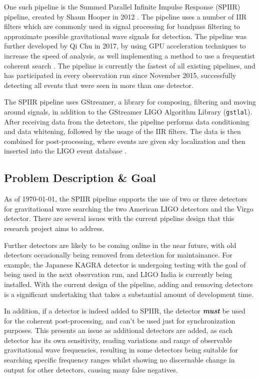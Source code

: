 \documentclass{article}
\begin{document}
One such pipeline is the Summed Parallel Infinite Impulse Response (SPIIR) pipeline, created by
Shaun Hooper in 2012 \cite{SPIIRCreate}. The pipeline uses a number of IIR filters \textendash{}
which are commonly used in signal processing for bandpass filtering \textendash{} to approximate
possible gravitational wave signals for detection. The pipeline was further developed by Qi Chu in
2017, by using GPU acceleration techniques to increase the speed of analysis, as well implementing
a method to use a frequentist coherent search \cite{ChuThesis}. The pipeline is currently the
fastest of all existing pipelines, and has participated in every observation run since November
2015, successfully detecting all events that were seen in more than one detector.

The SPIIR pipeline uses GStreamer, a library for composing, filtering and moving around signals, in
addition to the GStreamer LIGO Algorithm Library (\texttt{gstlal}). After receiving data from the
detectors, the pipeline performs data conditioning and data whitening, followed by the usage of the
IIR filters. The data is then combined for post-processing, where events are given sky localization
and then inserted into the LIGO event database \cite{SPIIRGPU2018}.

\subsection{Problem Description \& Goal}
As of \today{}, the SPIIR pipeline supports the use of two or three detectors for gravitational
wave searching \textendash{} the two American LIGO detectors and the Virgo detector. There are
several issues with the current pipeline design that this research project aims to address.

Further detectors are likely to be coming online in the near future, with old detectors occasionally
being removed from detection for maintainance. For example, the Japanese KAGRA detector is
undergoing testing with the goal of being used in the next observation run, and LIGO India is
currently being installed. With the current design of the pipeline, adding and removing detectors is
a significant undertaking that takes a substantial amount of development time.

In addition, if a detector is indeed added to SPIIR, the detector \textit{\textbf{must}} be used for
the coherent post-processing, and can't be used just for synchronization purposes. This presents an
issue as additional detectors are added, as each detector has its own sensitivity, reading
variations and range of observable gravitational wave frequencies, resulting in some detectors being
suitable for searching specific frequency ranges whilst showing no discernable change in output for
other detectors, causing many false negatives.
\end{document}
